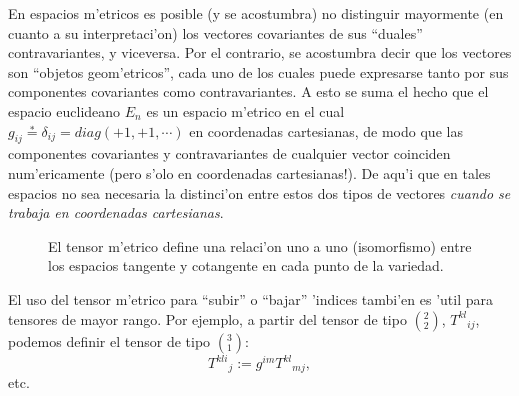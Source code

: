 En espacios m'etricos es posible (y se acostumbra) no distinguir mayormente (en cuanto a su interpretaci'on) los vectores covariantes de sus ``duales'' contravariantes, y viceversa. Por el contrario, se acostumbra decir que los vectores son ``objetos geom'etricos'', cada uno de los cuales puede expresarse tanto por sus componentes covariantes como contravariantes. A esto se suma el hecho que el espacio euclideano $E_n$ es un espacio m'etrico en el cual $g_{ij}\overset{\ast}{=}\delta_{ij}=diag(+1,+1,\cdots)$ en coordenadas cartesianas, de modo que las componentes covariantes y contravariantes de cualquier vector coinciden num'ericamente (pero s'olo en coordenadas cartesianas!). De aqu'i que en tales espacios no sea necesaria la distinci'on entre estos dos tipos de vectores \textit{cuando se trabaja en coordenadas cartesianas}.
\begin{center}
\begin{figure}[H]
\centerline{}
\caption{El tensor m'etrico define una relaci'on uno a uno (isomorfismo) entre
los espacios tangente y cotangente en cada punto de la variedad.}
\label{5}
\end{figure}
\end{center}

El uso del tensor m'etrico para ``subir'' o ``bajar'' 'indices tambi'en es 'util para tensores de mayor rango. Por ejemplo, a partir del tensor de tipo $(^2_2)$, $T^{kl}{}_{i j}$, podemos definir el tensor de tipo $(^3_1)$:
\begin{equation}
T^{kl i}{}_j:=g^{im}T^{kl}{}_{mj},
\label{g10}
\end{equation}
etc.

